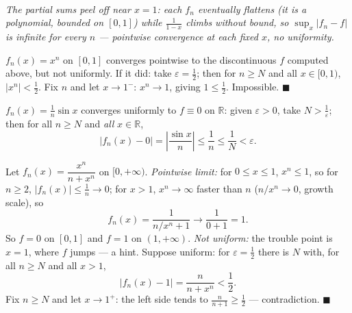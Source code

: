 \documentclass[11pt]{report}
\newcommand{\figcap}[1]{\\[1.5mm]\parbox{0.92\textwidth}{\small\itshape #1}}
\begin{document}
\begin{center}
\figcap{The partial sums peel off near $x = 1$: each $f_n$ eventually flattens (it is a polynomial, bounded on $[0,1]$) while $\tfrac{1}{1-x}$ climbs without bound, so $\sup_x |f_n - f|$ is infinite for every $n$ --- pointwise convergence at each fixed $x$, no uniformity.}
\end{center}


\begin{exbox}
$f_n(x) = x^n$ on $[0,1]$ converges pointwise to the discontinuous $f$ computed above, but not uniformly. If it did: take $\varepsilon = \tfrac12$; then for $n \geq N$ and all $x \in [0,1)$, $|x^n| < \tfrac12$. Fix $n$ and let $x \to 1^-$: $x^n \to 1$, giving $1 \leq \tfrac12$. Impossible. \hfill $\blacksquare$
\end{exbox}

\begin{exbox}
$f_n(x) = \tfrac1n \sin x$ converges uniformly to $f \equiv 0$ on $\mathbb{R}$: given $\varepsilon > 0$, take $N > \tfrac1\varepsilon$; then for all $n \geq N$ and \emph{all} $x \in \mathbb{R}$,
\[
|f_n(x) - 0| = \left| \frac{\sin x}{n} \right| \leq \frac1n \leq \frac1N < \varepsilon. \tag*{$\blacksquare$}
\]
\end{exbox}

\begin{exbox}
Let $f_n(x) = \dfrac{x^n}{n + x^n}$ on $[0, +\infty)$. \emph{Pointwise limit:} for $0 \leq x \leq 1$, $x^n \leq 1$, so for $n \geq 2$, $|f_n(x)| \leq \tfrac1n \to 0$; for $x > 1$, $x^n \to \infty$ faster than $n$ ($n/x^n \to 0$, growth scale), so
\[
f_n(x) = \frac{1}{n/x^n + 1} \longrightarrow \frac{1}{0+1} = 1.
\]
So $f = 0$ on $[0,1]$ and $f = 1$ on $(1,+\infty)$. \emph{Not uniform:} the trouble point is $x = 1$, where $f$ jumps --- a hint. Suppose uniform: for $\varepsilon = \tfrac12$ there is $N$ with, for all $n \geq N$ and all $x > 1$,
\[
|f_n(x) - 1| = \frac{n}{n + x^n} < \frac12.
\]
Fix $n \geq N$ and let $x \to 1^+$: the left side tends to $\tfrac{n}{n+1} \geq \tfrac12$ --- contradiction. \hfill $\blacksquare$
\end{exbox}
\end{document}
